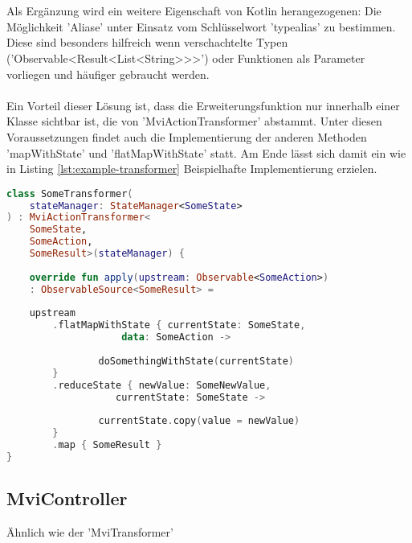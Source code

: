 \\\\
Als Ergänzung wird ein weitere Eigenschaft von Kotlin herangezogenen: Die Möglichkeit 'Aliase' unter Einsatz vom Schlüsselwort 'typealias' zu bestimmen. Diese sind besonders hilfreich wenn verschachtelte Typen ('Observable<Result<List<String>>>') oder Funktionen als Parameter vorliegen und häufiger gebraucht werden.
\\\\
Ein Vorteil dieser Lösung ist, dass die Erweiterungsfunktion nur innerhalb einer Klasse sichtbar ist, die von 'MviActionTransformer' abstammt. Unter diesen Voraussetzungen findet auch die Implementierung der anderen Methoden 'mapWithState' und 'flatMapWithState' statt. Am Ende lässt sich damit ein wie in Listing
\ref{lst:example-transformer}
Beispielhafte Implementierung erzielen. 
\begin{lstlisting}[caption={Beispiel Implementation}, label={lst:example-transformer},language=Kotlin]
class SomeTransformer(
	stateManager: StateManager<SomeState>
) : MviActionTransformer<
	SomeState,
	SomeAction,
	SomeResult>(stateManager) {
	
	override fun apply(upstream: Observable<SomeAction>)
	: ObservableSource<SomeResult> =
	
	upstream
		.flatMapWithState { currentState: SomeState,
					data: SomeAction ->
		
				doSomethingWithState(currentState)
		}
		.reduceState { newValue: SomeNewValue,
				   currentState: SomeState ->
		
				currentState.copy(value = newValue)
		}
		.map { SomeResult }
}
\end{lstlisting}

\subsection{MviController}
Ähnlich wie der 'MviTransformer'


